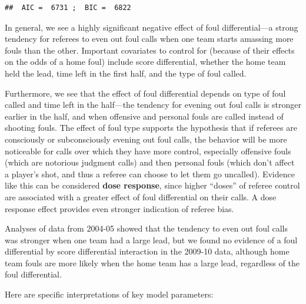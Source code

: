 \documentclass[
]{krantz}
\begin{document}
\begin{verbatim}
##  AIC =  6731 ;  BIC =  6822
\end{verbatim}

In general, we see a highly significant negative effect of foul differential---a strong tendency for referees to even out foul calls when one team starts amassing more fouls than the other. Important covariates to control for (because of their effects on the odds of a home foul) include score differential, whether the home team held the lead, time left in the first half, and the type of foul called.

Furthermore, we see that the effect of foul differential depends on type of foul called and time left in the half---the tendency for evening out foul calls is stronger earlier in the half, and when offensive and personal fouls are called instead of shooting fouls. The effect of foul type supports the hypothesis that if referees are consciously or subconsciously evening out foul calls, the behavior will be more noticeable for calls over which they have more control, especially offensive fouls (which are notorious judgment calls) and then personal fouls (which don't affect a player's shot, and thus a referee can choose to let them go uncalled). Evidence like this can be considered \textbf{dose response},  since higher ``doses'' of referee control are associated with a greater effect of foul differential on their calls. A dose response effect provides even stronger indication of referee bias.

Analyses of data from 2004-05 \citep{Noecker2012} showed that the tendency to even out foul calls was stronger when one team had a large lead, but we found no evidence of a foul differential by score differential interaction in the 2009-10 data, although home team fouls are more likely when the home team has a large lead, regardless of the foul differential.

Here are specific interpretations of key model parameters:
\end{document}
